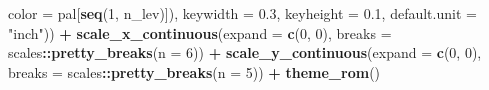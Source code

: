 \documentclass[]{article}
\newenvironment{Shaded}{\begin{snugshade}}{\end{snugshade}}
\newcommand{\KeywordTok}[1]{\textcolor[rgb]{0.13,0.29,0.53}{\textbf{#1}}}
\newcommand{\DataTypeTok}[1]{\textcolor[rgb]{0.13,0.29,0.53}{#1}}
\newcommand{\DecValTok}[1]{\textcolor[rgb]{0.00,0.00,0.81}{#1}}
\newcommand{\FloatTok}[1]{\textcolor[rgb]{0.00,0.00,0.81}{#1}}
\newcommand{\StringTok}[1]{\textcolor[rgb]{0.31,0.60,0.02}{#1}}
\newcommand{\OperatorTok}[1]{\textcolor[rgb]{0.81,0.36,0.00}{\textbf{#1}}}
\newcommand{\NormalTok}[1]{#1}
\begin{document}
\begin{Shaded}
\begin{Highlighting}[]
                                                  \DataTypeTok{color =}\NormalTok{ pal[}\KeywordTok{seq}\NormalTok{(}\DecValTok{1}\NormalTok{, n_lev)]),}
                              \DataTypeTok{keywidth =} \FloatTok{0.3}\NormalTok{,}
                              \DataTypeTok{keyheight =} \FloatTok{0.1}\NormalTok{,}
                              \DataTypeTok{default.unit =} \StringTok{"inch"}\NormalTok{)) }\OperatorTok{+}
\StringTok{  }\KeywordTok{scale_x_continuous}\NormalTok{(}\DataTypeTok{expand =} \KeywordTok{c}\NormalTok{(}\DecValTok{0}\NormalTok{, }\DecValTok{0}\NormalTok{), }\DataTypeTok{breaks =}\NormalTok{ scales}\OperatorTok{::}\KeywordTok{pretty_breaks}\NormalTok{(}\DataTypeTok{n =} \DecValTok{6}\NormalTok{)) }\OperatorTok{+}
\StringTok{  }\KeywordTok{scale_y_continuous}\NormalTok{(}\DataTypeTok{expand =} \KeywordTok{c}\NormalTok{(}\DecValTok{0}\NormalTok{, }\DecValTok{0}\NormalTok{), }\DataTypeTok{breaks =}\NormalTok{ scales}\OperatorTok{::}\KeywordTok{pretty_breaks}\NormalTok{(}\DataTypeTok{n =} \DecValTok{5}\NormalTok{)) }\OperatorTok{+}
\StringTok{  }\KeywordTok{theme_rom}\NormalTok{()}
\end{Highlighting}
\end{Shaded}
\end{document}
